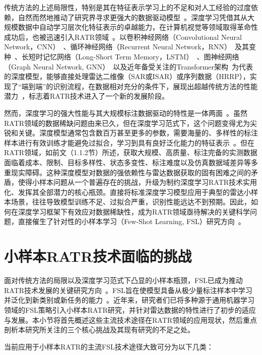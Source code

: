 {传统方法的上述局限性，特别是其在特征表示学习上的不足和对人工经验的过度依赖，自然而然地推动了研究界寻求更强大的数据驱动模型~\cite{X}。深度学习凭借其从大规模数据中自动学习层次化特征表示的卓越能力，在计算机视觉等领域取得革命性成功后，也被迅速引入RATR领域~\cite{X}。以卷积神经网络（Convolutional Neural Network，CNN）~\cite{X}、循环神经网络（Recurrent Neural Network，RNN）~\cite{X}及其变种~\cite{X}、长短时记忆网络（Long-Short Term Memory，LSTM）~\cite{X}、图神经网络（Graph Neural Network, GNN）~\cite{X}以及近年备受关注的Transformer架构~\cite{X}为代表的深度模型，能够直接处理雷达二维像（SAR或ISAR）或序列数据（HRRP），实现了“端到端”的识别流程，在数据相对充分的条件下，展现出超越传统方法的性能潜力~\cite{X}，标志着RATR技术进入了一个新的发展阶段。

然而，深度学习的强大性能与其大规模标注数据驱动的特性是一体两面~\cite{X}。虽然RATR领域的数据稀缺问题由来已久，但在深度学习范式下，这个问题变得尤为尖锐和关键。深度模型通常包含数百万甚至更多的参数，需要海量的、多样性的标注样本进行有效训练才能避免过拟合，学习到具有良好泛化能力的特征表示~\cite{X}。但在RATR领域，如前文（1.1.2节）所述，获取大规模、高质量、标注完备的实测数据面临着成本、限制、目标多样性、状态多变性、标注难度以及仿真数据域差异等多重现实障碍。这种深度模型对数据的强依赖性与雷达数据获取的固有困难之间的矛盾，使得{小样本问题从一个普遍存在的挑战，升级为制约深度学习RATR技术实用化、发挥其全部潜力的核心瓶颈}。直接将标准深度学习模型应用于典型的雷达小样本场景，往往导致模型训练不足、过拟合严重，识别性能远达不到预期。因此，如何在深度学习框架下有效应对数据稀缺性，成为RATR领域亟待解决的关键科学问题，直接催生了针对性的{小样本学习（Few-Shot Learning, FSL）}研究方向~\cite{X}。


\section{小样本RATR技术面临的挑战}
面对传统方法的局限以及深度学习范式下凸显的小样本瓶颈，FSL已成为推动RATR技术发展的关键研究方向~\cite{X}。FSL旨在使模型具备从极少量标注样本中学习并泛化到新类别或新任务的能力~\cite{X}。近年来，研究者们已将多种源于通用机器学习领域的FSL策略引入小样本RATR研究，并针对雷达数据的特性进行了初步的适应与发展。本小节将首先概述这些主流技术途径在RATR领域的应用现状，然后重点剖析本研究所关注的三个核心挑战及其现有研究的不足之处。

当前应用于小样本RATR的主流FSL技术途径大致可分为以下几类：

}
